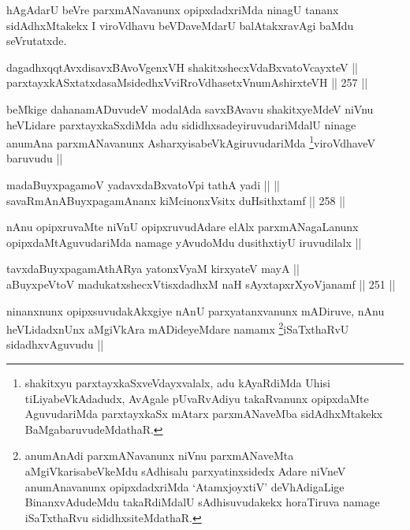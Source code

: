 \begin{artha}
hAgAdarU beVre parxmANavanunx opipxdadxriMda ninagU tananx sidAdhxMtakekx I viroVdhavu beVDaveMdarU balAtakxravAgi baMdu seVrutatxde. 
\end{artha}

\begin{shl}
dagadhxqqtAvxdisavxBAvoV\s genxVH shakitxshecxVdaBxvatoVcayxteV ||  \\
parxtayxkASxtatxdasaMsidedhxVviRroVdhasetxV\s numAshirxteVH ||  257 ||  
\end{shl}

\begin{artha}
beMkige dahanamADuvudeV modalAda savxBAvavu shakitxyeMdeV niVnu heVLidare parxtayxkaSxdiMda adu sididhxsadeyiruvudariMdalU ninage anumAna parxmANavanunx AsharxyisabeVkAgiruvudariMda \footnote{shakitxyu parxtayxkaSxveVdayxvalalx, adu kAyaRdiMda Uhisi tiLiyabeVkAdadudx, AvAgale pUvaRvAdiyu takaRvanunx opipxdaMte AguvudariMda parxtayxkaSx mAtarx parxmANaveMba sidAdhxMtakekx BaMgabaruvudeMdathaR.}viroVdhaveV baruvudu ||
\end{artha}


\begin{shl}
madaBuyxpagamoV yadavxdaBxvatoV\s pi tathA yadi ||  ||  \\
savaRmAnABuyxpagamAnanx kiMcinonxV\s sitx duHsithxtamf ||  258 ||  
\end{shl}

\begin{artha}
nAnu opipxruvaMte niVnU opipxruvudAdare elAlx parxmANagaLanunx opipxdaMtAguvudariMda namage yAvudoMdu dusithxtiyU iruvudilalx ||
\end{artha}

\begin{shl}
tavxdaBuyxpagamAthARya yatonxV\s yaM kirxyateV mayA || \\
aBuyxpeVtoV madukatxshecxVtisxdadhxM naH sAyxtapxrXyoVjanamf ||  251 ||  
\end{shl}

\begin{artha}
ninanxnunx opipxsuvudakAkxgiye nAnU parxyatanxvanunx mADiruve, nAnu heVLidadxnUnx aMgiVkAra mADideyeMdare namamx \footnote{anumAnAdi parxmANavanunx niVnu parxmANaveMta aMgiVkarisabeVkeMdu sAdhisalu parxyatinxsidedx Adare niVneV anumAnavanunx opipxdadxriMda `AtamxjoyxtiV' deVhAdigaLige BinanxvAdudeMdu takaRdiMdalU sAdhisuvudakekx horaTiruva namage iSaTxthaRvu sididhxsiteMdathaR.}iSaTxthaRvU sidadhxvAguvudu ||
\end{artha}

